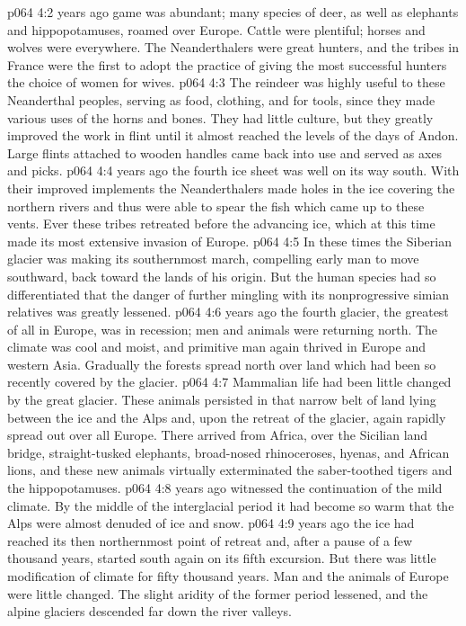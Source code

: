 \pc \vs p064 4:2  years ago game was abundant; many species of deer, as well as elephants and hippopotamuses, roamed over Europe. Cattle were plentiful; horses and wolves were everywhere. The Neanderthalers were great hunters, and the tribes in France were the first to adopt the practice of giving the most successful hunters the choice of women for wives.
\vs p064 4:3 The reindeer was highly useful to these Neanderthal peoples, serving as food, clothing, and for tools, since they made various uses of the horns and bones. They had little culture, but they greatly improved the work in flint until it almost reached the levels of the days of Andon. Large flints attached to wooden handles came back into use and served as axes and picks.
\pc \vs p064 4:4  years ago the fourth ice sheet was well on its way south. With their improved implements the Neanderthalers made holes in the ice covering the northern rivers and thus were able to spear the fish which came up to these vents. Ever these tribes retreated before the advancing ice, which at this time made its most extensive invasion of Europe.
\vs p064 4:5 In these times the Siberian glacier was making its southernmost march, compelling early man to move southward, back toward the lands of his origin. But the human species had so differentiated that the danger of further mingling with its nonprogressive simian relatives was greatly lessened.\plusone
\pc \vs p064 4:6  years ago the fourth glacier, the greatest of all in Europe, was in recession; men and animals were returning north. The climate was cool and moist, and primitive man again thrived in Europe and western Asia. Gradually the forests spread north over land which had been so recently covered by the glacier.
\vs p064 4:7 Mammalian life had been little changed by the great glacier. These animals persisted in that narrow belt of land lying between the ice and the Alps and, upon the retreat of the glacier, again rapidly spread out over all Europe. There arrived from Africa, over the Sicilian land bridge, straight\hyp{}tusked elephants, broad\hyp{}nosed rhinoceroses, hyenas, and African lions, and these new animals virtually exterminated the saber\hyp{}toothed tigers and the hippopotamuses.
\pc \vs p064 4:8  years ago witnessed the continuation of the mild climate. By the middle of the interglacial period it had become so warm that the Alps were almost denuded of ice and snow.
\pc \vs p064 4:9  years ago the ice had reached its then northernmost point of retreat and, after a pause of a few thousand years, started south again on its fifth excursion. But there was little modification of climate for fifty thousand years. Man and the animals of Europe were little changed. The slight aridity of the former period lessened, and the alpine glaciers descended far down the river valleys.
